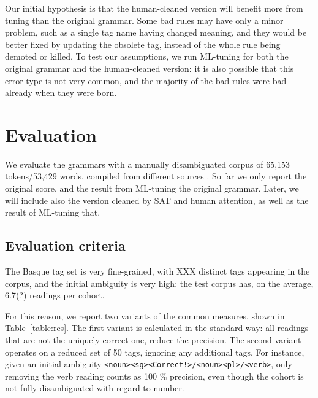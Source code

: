 \documentclass[11pt]{article}
\def\t#1{\texttt{#1}}
\begin{document}
Our initial hypothesis is that the human-cleaned version will benefit more 
from tuning than the original grammar. Some bad rules may have only a minor 
problem, such as a single tag name having changed meaning, and they would be 
better fixed by updating the obsolete tag, instead of the whole rule being 
demoted or killed. 
To test our assumptions, we run ML-tuning for both the original grammar and 
the human-cleaned version: it is also possible that this error type is not very 
common, and the majority of the bad rules were bad already when they were born.



\section{Evaluation}

We evaluate the grammars with a manually disambiguated corpus of 65,153 tokens/53,429 words,
compiled from different sources \cite{aduriz2006epec}.
So far we only report the original score, and the result from ML-tuning the original grammar.
Later, we will include also the version cleaned by SAT and human attention, as well as
the result of ML-tuning that.

\subsection{Evaluation criteria}

The Basque tag set is very fine-grained, with XXX distinct tags appearing in the corpus,
and the initial ambiguity is very high: the test corpus has, on the average,
6.7(?) readings per cohort. 

For this reason, we report two variants of the common measures,
shown in Table~\ref{table:res}.
The first variant is calculated in the standard way: all readings that 
are not the uniquely correct one, reduce the precision. 
The second variant operates on a reduced set of 50 tags, ignoring any additional tags.
For instance, given an initial ambiguity \t{<noun><sg><Correct!>/<noun><pl>/<verb>}, 
only removing the verb reading counts as 100 \% precision, even though the cohort is
not fully disambiguated with regard to number.
\end{document}
